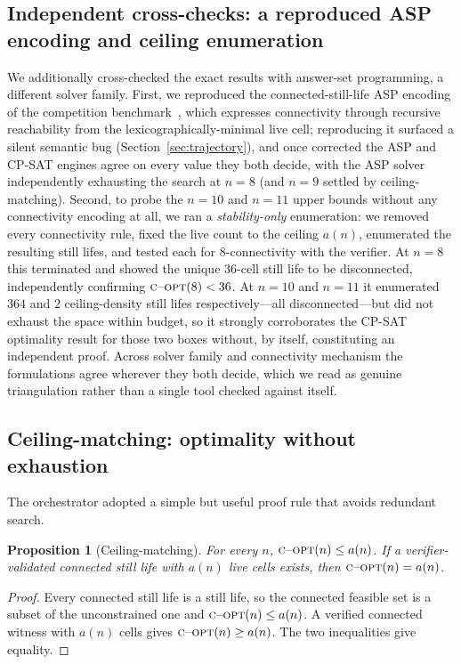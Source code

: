\documentclass{article}
\newcommand{\copt}{\textsc{c\textendash opt}}
\newtheorem{proposition}{Proposition}
\begin{document}
\subsection{Independent cross-checks: a reproduced ASP encoding and ceiling enumeration}
\label{sec:asp}
We additionally cross-checked the exact results with answer-set programming, a different solver family. First, we reproduced the connected-still-life ASP encoding of the competition benchmark~\citep{aspcomp2013}, which expresses connectivity through recursive reachability from the lexicographically-minimal live cell; reproducing it surfaced a silent semantic bug (Section~\ref{sec:trajectory}), and once corrected the ASP and CP-SAT engines agree on every value they both decide, with the ASP solver independently exhausting the search at $n=8$ (and $n=9$ settled by ceiling-matching). Second, to probe the $n=10$ and $n=11$ upper bounds without any connectivity encoding at all, we ran a \emph{stability-only} enumeration: we removed every connectivity rule, fixed the live count to the ceiling $a(n)$, enumerated the resulting still lifes, and tested each for $8$-connectivity with the verifier. At $n=8$ this terminated and showed the unique $36$-cell still life to be disconnected, independently confirming $\copt(8)<36$. At $n=10$ and $n=11$ it enumerated $364$ and $2$ ceiling-density still lifes respectively---all disconnected---but did not exhaust the space within budget, so it strongly corroborates the CP-SAT optimality result for those two boxes without, by itself, constituting an independent proof. Across solver family and connectivity mechanism the formulations agree wherever they both decide, which we read as genuine triangulation rather than a single tool checked against itself.

\subsection{Ceiling-matching: optimality without exhaustion}
\label{sec:ceiling}
The orchestrator adopted a simple but useful proof rule that avoids redundant search.

\begin{proposition}[Ceiling-matching]
\label{prop:ceiling}
For every $n$, $\copt(n)\le a(n)$. If a verifier-validated connected still life with $a(n)$ live cells exists, then $\copt(n)=a(n)$.
\end{proposition}
\begin{proof}
Every connected still life is a still life, so the connected feasible set is a subset of the unconstrained one and $\copt(n)\le a(n)$. A verified connected witness with $a(n)$ cells gives $\copt(n)\ge a(n)$. The two inequalities give equality.
\end{proof}
\end{document}
